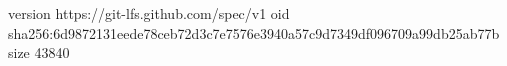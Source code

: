 version https://git-lfs.github.com/spec/v1
oid sha256:6d9872131eede78ceb72d3c7e7576e3940a57c9d7349df096709a99db25ab77b
size 43840
